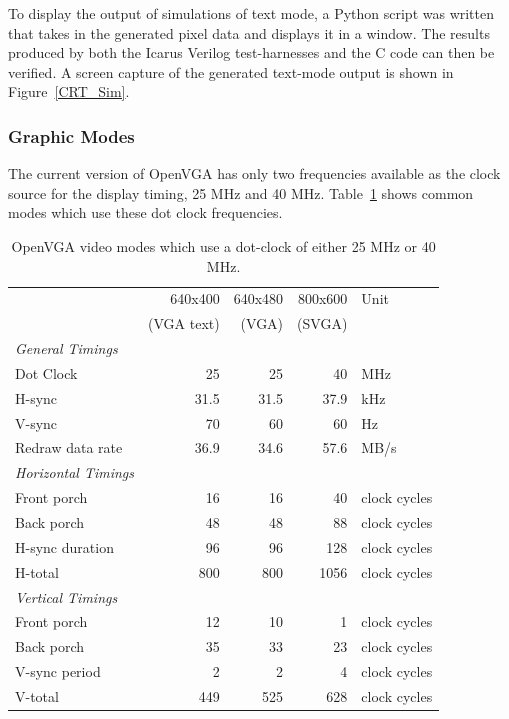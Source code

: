 To display the output of simulations of text mode, a Python script was written
that takes in the generated pixel data and displays it in a window. The results
produced by both the Icarus Verilog test-harnesses and the C code can then be
verified. A screen capture of the generated text-mode output is shown in
Figure~\ref{CRT_Sim}.

\subsubsection{Graphic Modes}
\label{VIDEO_Modes}
The current version of OpenVGA has only two frequencies available as the clock
source for the display timing, 25 MHz and 40 MHz. Table~\ref{VIDEO_Modes_Table}
shows common modes which use these dot clock frequencies.


\begin{table}[h!]
\begin{center}
\begin{tabular}{l r r r l}
				& 640x400	& 640x480	& 800x600	& Unit	\\
				& (VGA text)& (VGA)		& (SVGA)	&		\\
\hline
\textit{General Timings}	&	&	&	& \\
Dot Clock		&	25		&	25		&	40		& MHz	\\
H-sync			&	31.5	&	31.5	&	37.9	& kHz	\\
V-sync			&	70		&	60		&	60		& Hz	\\
Redraw data rate&	36.9	&	34.6	&	57.6	& MB/s	\\
\textit{Horizontal Timings}	&	&	&	& \\
Front porch		&	16		&	16		&	40		& clock cycles	\\
Back porch		&	48		&	48		&	88		& clock cycles	\\
H-sync duration	&	96		&	96		&	128		& clock cycles	\\
H-total			&	800		&	800		&	1056	& clock cycles	\\
\textit{Vertical Timings}	&	&	&	& \\
Front porch		&	12		&	10		&	1		& clock cycles	\\
Back porch		&	35		&	33		&	23		& clock cycles	\\
V-sync period	&	2		&	2		&	4		& clock cycles	\\
V-total			&	449		&	525		&	628		& clock cycles	\\
\end{tabular}
\end{center}
\caption[OpenVGA video modes]{OpenVGA video modes which use a dot-clock of
either 25 MHz or 40 MHz.}
\label{VIDEO_Modes_Table}
\end{table}


